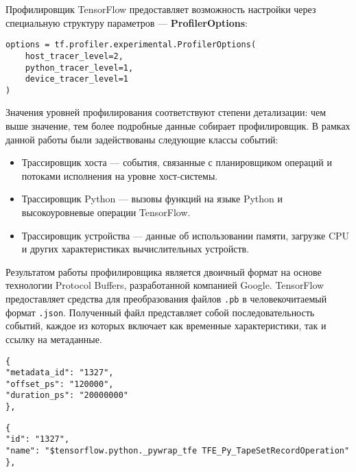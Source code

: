 Профилировщик TensorFlow предоставляет возможность настройки через специальную структуру параметров — \textbf{ProfilerOptions}:

\begin{lstlisting}[caption={Опции профилирования \textbf{TF Profiler}}]
options = tf.profiler.experimental.ProfilerOptions(
    host_tracer_level=2,
    python_tracer_level=1,
    device_tracer_level=1
)
\end{lstlisting}

Значения уровней профилирования соответствуют степени детализации: чем выше значение, тем более подробные данные собирает профилировщик.
В рамках данной работы были задействованы следующие классы событий:

\begin{itemize}
\item Трассировщик хоста — события, связанные с планировщиком операций и потоками исполнения на уровне хост-системы.
\item Трассировщик Python — вызовы функций на языке Python и высокоуровневые операции TensorFlow.
\item Трассировщик устройства — данные об использовании памяти, загрузке CPU и других характеристиках вычислительных устройств.
\end{itemize}

Результатом работы профилировщика является двоичный формат на основе технологии Protocol Buffers, разработанной компанией Google.
TensorFlow предоставляет средства для преобразования файлов \texttt{.pb} в человекочитаемый формат \texttt{.json}.
Полученный файл представляет собой последовательность событий, каждое из которых включает как временные характеристики, так и ссылку на метаданные.

\noindent
\begin{minipage}{0.48\textwidth}
\begin{lstlisting}[caption={Данные события \textbf{TF Profiler}}]
{
"metadata_id": "1327",
"offset_ps": "120000",
"duration_ps": "20000000"
},
\end{lstlisting}
\end{minipage}\hfill
\begin{minipage}{0.48\textwidth}
\begin{lstlisting}[caption={Метаданные события \textbf{TF Profiler}}]
{
"id": "1327",
"name": "$tensorflow.python._pywrap_tfe TFE_Py_TapeSetRecordOperation"
},
\end{lstlisting}
\end{minipage}

